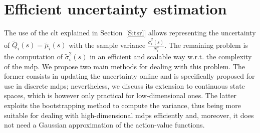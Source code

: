 \section{Efficient uncertainty estimation}\label{S:uncertainty}
The use of the \gls{clt} explained in Section~\ref{S:tsrl} allows representing the uncertainty of $\tilde{Q}_i(s) = \tilde{\mu}_i(s)$ with the sample variance $\frac{\tilde{\sigma}^2_i(s)}{N_i^s}$. The remaining problem is the computation of $\tilde{\sigma}^2_i(s)$ in an efficient and scalable way w.r.t. the complexity of the \gls{mdp}. We propose two main methods for dealing with this problem. The former consists in updating the uncertainty online and is specifically proposed for use in discrete \glspl{mdp}; nevertheless, we discuss its extension to continuous state spaces, which is however only practical for low-dimensional ones. The latter exploits the bootstrapping method to compute the variance, thus being more suitable for dealing with high-dimensional \glspl{mdp} efficiently and, moreover, it does not need a Gaussian approximation of the action-value functions.


